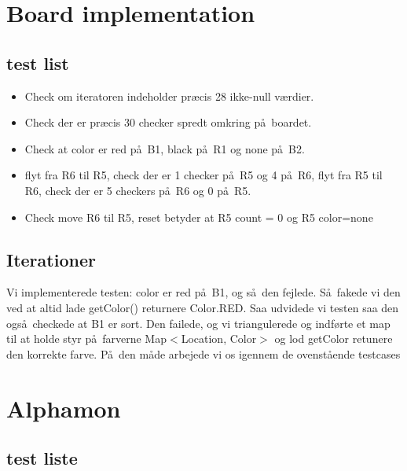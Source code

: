 \documentclass[a4paper]{article}
\begin{document}
\lhead{}
\rhead{}


\section{Board implementation}
\subsection{test list}
\begin{itemize}
\item Check om iteratoren indeholder pr\ae cis 28 ikke-null v\ae rdier.
\item Check der er pr\ae cis 30 checker spredt omkring p\aa\ boardet.
\item Check at color er red p\aa\ B1, black p\aa\ R1 og none p\aa\ B2.
\item flyt fra R6 til R5, check der er 1 checker p\aa\ R5 og 4 p\aa\ R6,
flyt fra R5 til R6, check der er 5 checkers p\aa\ R6 og 0 p\aa\ R5.

\item Check move R6 til R5, reset betyder at R5 count = 0 og R5 color=none
\end{itemize}

\subsection{Iterationer}

Vi implementerede testen: color er red p\aa\ B1, og s\aa\ den fejlede.
S\aa\ fakede vi den ved at altid lade getColor() returnere Color.RED.
Saa udvidede vi testen saa den ogs\aa\ checkede at B1 er sort.
Den failede, og vi triangulerede og indf\o rte et map til at holde styr
p\aa\ farverne Map$<$Location, Color$>$ og lod getColor retunere den korrekte
farve.
P\aa\ den m\aa de arbejede vi os igennem de ovenst\aa ende testcases



\section{Alphamon}

\subsection{test liste}
\end{document}
